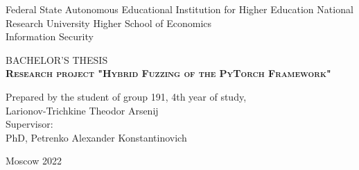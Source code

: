 \begin{titlepage}
    \newpage

    {
        \begin{center}
            Federal State Autonomous Educational Institution for Higher Education
            National Research University Higher School of Economics
            \\
            \bigskip
            Information Security \\
        \end{center}
    }

    \vspace{8em}

    \begin{center}
        {\Large BACHELOR'S THESIS}\\
        \textsc{\textbf{
                Research project
                \linebreak
                "Hybrid Fuzzing of the PyTorch Framework"}}
    \end{center}

    \vspace{4em}

    {
        \hfill\parbox{16cm}{
            \hspace*{5cm}\hspace*{-5cm}Prepared by the student of group 191, 4th year of study,\\
            Larionov-Trichkine Theodor Arsenij\\

            \hspace*{5cm}\hspace*{-5cm}Supervisor:\\
            PhD, Petrenko Alexander Konstantinovich
            \\
        }
    }

    \vspace{\fill}

    \begin{center}
        Moscow 2022
    \end{center}

\end{titlepage}
